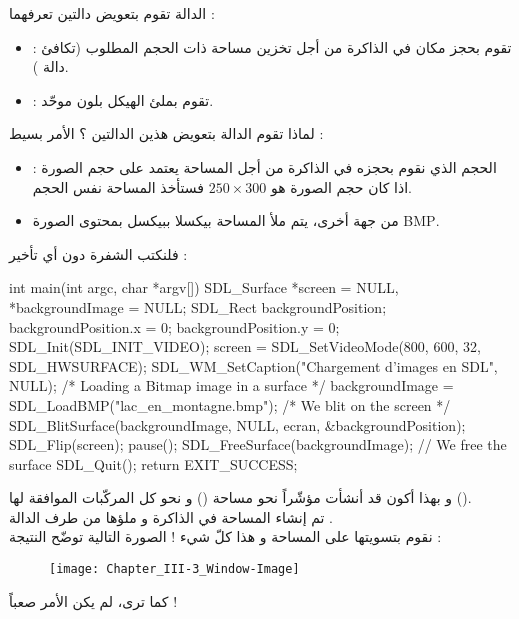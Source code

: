 الدالة
تقوم بتعويض دالتين تعرفهما :

\begin{itemize}
	\item {} :
	تقوم بحجز مكان في الذاكرة من أجل تخزين مساحة ذات الحجم المطلوب (تكافئ دالة 
	).
	\item {} :
	تقوم بملئ الهيكل بلون موحّد.
\end{itemize}
لماذا تقوم الدالة بتعويض هذين الدالتين ؟ الأمر بسيط :
\begin{itemize}
	\item الحجم الذي نقوم بحجزه في الذاكرة  من أجل المساحة يعتمد على حجم الصورة : اذا كان حجم الصورة هو 
	$250 \times 300$
	فستأخذ المساحة نفس الحجم.
	\item من جهة أخرى، يتم ملأ المساحة بيكسلا ببيكسل بمحتوى الصورة 
	\textenglish{BMP}.
\end{itemize}

فلنكتب الشفرة دون أي تأخير :

\begin{Csource}
int main(int argc, char *argv[])
{
	SDL_Surface *screen = NULL, *backgroundImage = NULL;
	SDL_Rect backgroundPosition;
	backgroundPosition.x = 0;
	backgroundPosition.y = 0;
	SDL_Init(SDL_INIT_VIDEO);
	screen = SDL_SetVideoMode(800, 600, 32, SDL_HWSURFACE);
	SDL_WM_SetCaption("Chargement d'images en SDL", NULL);
	/* Loading a Bitmap image in a surface */	
	backgroundImage = SDL_LoadBMP("lac_en_montagne.bmp");
	/* We blit on the screen */
	SDL_BlitSurface(backgroundImage, NULL, ecran, &backgroundPosition);
	SDL_Flip(screen);
	pause();
	SDL_FreeSurface(backgroundImage); // We free the surface
	SDL_Quit();
	return EXIT_SUCCESS;
}
\end{Csource}

و بهذا أكون قد أنشأت مؤشّراً نحو مساحة
()
و نحو كل المركّبات الموافقة لها
().\\
تم إنشاء المساحة في الذاكرة و ملؤها من طرف الدالة 
.\\
نقوم بتسويتها على المساحة 
و هذا كلّ شيء ! الصورة التالية توضّح النتيجة :

\begin{figure}[H]
	\centering
	\texttt{[image: Chapter\_III-3\_Window-Image]}
\end{figure}

كما ترى، لم يكن الأمر صعباً !

